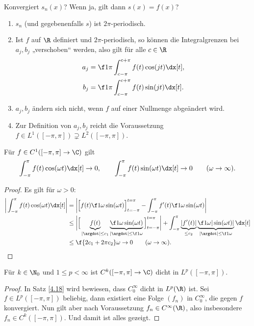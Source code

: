 Konvergiert $s_n(x)$? Wenn ja, gilt dann $s(x) = f(x)$?

\begin{nt}[Beobachtungen] \label{3.22}
	\begin{enumerate}[1)]
		\item
			$s_n$ (und gegebenenfalls $s$) ist $2\pi$-periodisch.
		\item
			Ist $f$ auf $\R$ definiert und $2\pi$-periodisch, so können die Integralgrenzen bei $a_j, b_j$ „verschoben“ werden, also gilt für alle $c \in \R$
			\begin{align*}
				a_j &= \f 1{\pi} \int_{c-\pi}^{c+\pi} f(t) \cos(jt) \dx[t], \\
				b_j &= \f 1{\pi} \int_{c-\pi}^{c+\pi} f(t) \sin(jt) \dx[t].
			\end{align*}
		\item
			$a_j, b_j$ ändern sich nicht, wenn $f$ auf einer Nullmenge abgeändert wird.
		\item
			Zur Definition von $a_j, b_j$ reicht die Voraussetzung $f \in L^1([-\pi, \pi]) \supsetneq L^2([-\pi, \pi])$.
	\end{enumerate}
\end{nt}

\begin{lem} \label{3.23}
	Für $f \in C^1([-\pi, \pi] \to \C)$ gilt
	\[
		\int_{-\pi}^{\pi} f(t) \cos(\omega t) \dx[t] \to 0, \qquad
		\int_{-\pi}^{\pi} f(t) \sin(\omega t) \dx[t] \to 0 \qquad (\omega \to \infty).
	\]
	\begin{proof}
		Es gilt für $\omega > 0$:
		\begin{align*}
			\bigg| \int_{-\pi}^{\pi} f(t) \cos(\omega t) \dx[t] \bigg|
			&= \bigg| \Big[f(t) \f 1{\omega} \sin(\omega t)\Big]_{t=-\pi}^{t=\pi} - \int_{-\pi}^{\pi} f'(t) \f 1{\omega} \sin(\omega t) \bigg| \\
			&\le \bigg|\Big[\underbrace{f(t)}_{|\argdot| \le c_1} \underbrace{\f 1{\omega} \sin(\omega t)}_{|\argdot| \le \f 1{\omega}}\Big]_{t=-\pi}^{t=\pi}\bigg| + \int_{-\pi}^{\pi} \underbrace{|f'(t)|}_{\le c_2} \underbrace{\f 1{\omega} |\sin(\omega t)|}_{|\argdot|\le \f 1{\omega}} \dx[t] \\
			&\le \f {2c_1 + 2\pi c_2}\omega \to 0 \qquad (\omega \to \infty).
		\end{align*}
	\end{proof}
\end{lem}

\begin{lem} \label{3.24}
	Für $k \in \N_0$ und $1 \le p < \infty$ ist $C^k([-\pi, \pi] \to \C)$ dicht in $L^p([-\pi, \pi])$.
	\begin{proof}
		In Satz \ref{4.18} wird bewiesen, dass $C_0^\infty$ dicht in $L^p(\R)$ ist.
		Sei $f\in L^p([-\pi,\pi])$ beliebig, dann existiert eine Folge $(f_n)$ in $C_0^\infty$,	die gegen $f$ konvergiert.
		Nun gilt aber nach Voraussetzung $f_n\in C^\infty(\R)$, also insbesondere $f_n \in C^k([-\pi,\pi])$.
		Und damit ist alles gezeigt.
	\end{proof}
\end{lem}

